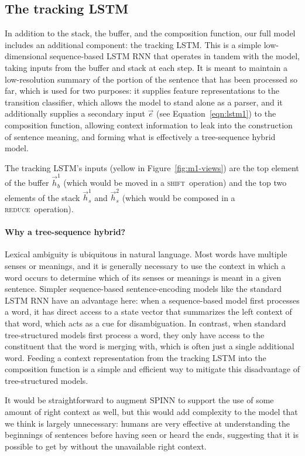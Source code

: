 \documentclass[11pt]{article}
\newcommand{\shift}{\textsc{shift}}
\newcommand{\reduce}{\textsc{reduce}}
\begin{document}
\subsection{The tracking LSTM}\label{sec:tracking}

In addition to the stack, the buffer, and the composition function, our full model includes an additional component: the tracking LSTM. This is a simple low-dimensional sequence-based LSTM RNN that operates in tandem with the model, taking inputs from the buffer and stack at each step. It is meant to maintain a low-resolution summary of the portion of the sentence that has been processed so far, which is used for two purposes: it supplies feature representations to the transition classifier, which allows the model to stand alone as a parser, and it additionally supplies a secondary input $\vec{e}$ (see Equation~\ref{eqn:lstm1}) to the composition function, allowing context information to leak into the construction of sentence meaning, and forming what is effectively a tree-sequence hybrid model.

The tracking LSTM's inputs (yellow in Figure~\ref{fig:m1-views}) are the top element of the buffer $\vec{h}_b^1$ (which would be moved in a \shift\ operation) and the top two elements of the stack $\vec{h}_s^1$ and $\vec{h}_s^2$ (which would be composed in a \reduce\ operation).

\paragraph{Why a tree-sequence hybrid?} 

Lexical ambiguity is ubiquitous in natural language. Most words have multiple senses or meanings, and it is generally necessary to use the context in which a word occurs to determine which of its senses or meanings is meant in a given sentence. Simpler sequence-based sentence-encoding models like the standard LSTM RNN have an advantage here: when a sequence-based model first processes a word, it has direct access to a state vector that summarizes the left context of that word, which acts as a cue for disambiguation. In contrast, when standard tree-structured models first process a word, they only have access to the constituent that the word is merging with, which is often just a single additional word. Feeding a context representation from the tracking LSTM into the composition function is a simple and efficient way to mitigate this disadvantage of tree-structured models. 

It would be straightforward to augment SPINN to support the use of some amount of right context as well, but this would add complexity to the model that we think is largely unnecessary: humans are very effective at understanding the beginnings of sentences before having seen or heard the ends, suggesting that it is possible to get by without the unavailable right context.
\end{document}
